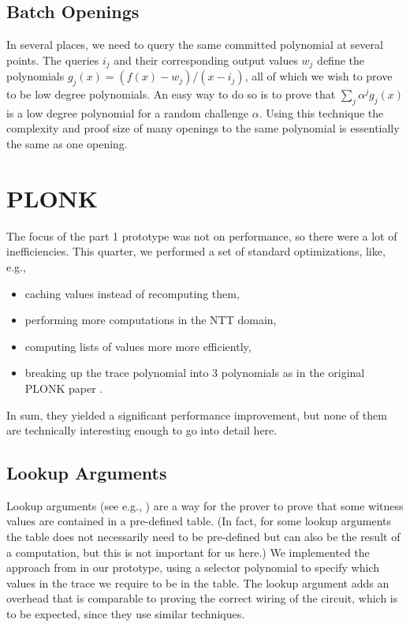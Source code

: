\documentclass{zamarep}
\begin{document}
\subsection{Batch Openings}
\label{sec:batch}
In several places, we need to query the same committed polynomial at several points. The queries $i_j$ and their corresponding output values $w_j$ define the polynomials $g_j(x) = (f(x) - w_j) / (x - i_j)$, all of which we wish to prove to be low degree polynomials. An easy way to do so is to prove that $\sum_j \alpha^j g_j(x)$ is a low degree polynomial for a random challenge $\alpha$. Using this technique the complexity and proof size of many openings to the same polynomial is essentially the same as one opening.

\section{PLONK}
\label{sec:plonk}

The focus of the part 1 prototype was not on performance, so there were a lot of inefficiencies. This quarter, we performed a set of standard optimizations, like, e.g.,
\begin{itemize}
\item caching values instead of recomputing them,
\item performing more computations in the NTT domain,
\item computing lists of values more more efficiently,
\item breaking up the trace polynomial into 3 polynomials as in the original PLONK paper \cite{EPRINT:GabWilCio19}.
\end{itemize}
In sum, they yielded a significant performance improvement, but none of them are technically interesting enough to go into detail here.

\subsection{Lookup Arguments}
\label{sec:lookup}
Lookup arguments (see e.g., \cite{EPRINT:PFMBM22,EPRINT:GabWil20,halo2}) are a way for the prover to prove that some witness values are contained in a pre-defined table. (In fact, for some lookup arguments the table does not necessarily need to be pre-defined but can also be the result of a computation, but this is not important for us here.) We implemented the approach from \cite{halo2} in our prototype, using a selector polynomial to specify which values in the trace we require to be in the table. The lookup argument adds an overhead that is comparable to proving the correct wiring of the circuit, which is to be expected, since they use similar techniques.
\end{document}
